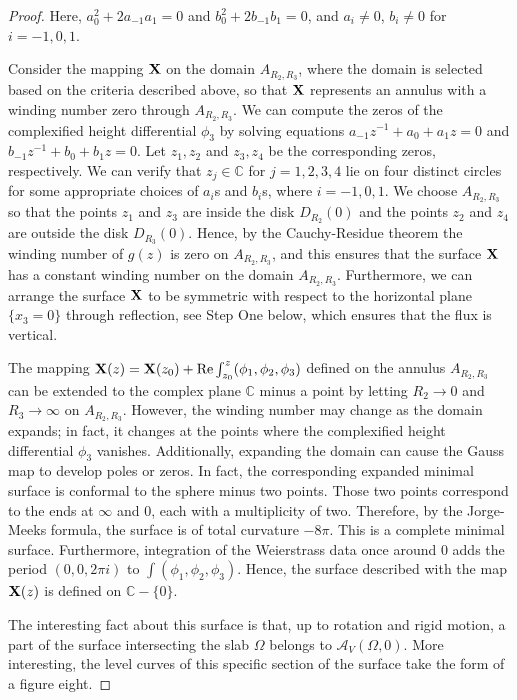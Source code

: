 \documentclass[11pt]{amsart}
\numberwithin{equation}{section}
\theoremstyle{theorem}
\theoremstyle{definition}
\numberwithin{equation}{section}
\begin{document}
\begin{proof}
Here, $a_0^2 + 2a_{-1}a_1 =0$ and $b_0^2 + 2b_{-1}b_1 =0$, and $a_i\neq 0$,  $b_i\neq 0$ for $i=-1,0,1$.
\medskip

Consider the mapping $\bold{X}$ on the domain $A_{R_2,R_3}$, where the domain is selected based on the criteria described above, so that $\bold{X}$ represents an annulus with a winding number zero through $A_{R_2,R_3}$. We can compute the zeros of the complexified height differential $\phi_3$ by solving equations  $a_{-1}z^{-1}+a_0+a_1z=0$ and $b_{-1}z^{-1}+b_0+b_1z=0$. Let $z_1,z_2$ and $z_3,z_4$ be the corresponding zeros, respectively. We can verify that $z_j \in \mathbb{C}$ for $j=1,2,3,4$ lie on four distinct circles for some appropriate choices of $a_i$s and $b_i$s, where $i=-1,0,1$. We choose $A_{R_2,R_3}$ so that the points $z_1$ and $z_3$ are inside the disk $D_{R_2}(0)$ and the points $z_2$ and $z_4$ are outside the disk $D_{R_3}(0)$. Hence, by the Cauchy-Residue theorem the winding number of $g(z)$ is zero on $A_{R_2,R_3}$, and this ensures that the surface $\bold{X}$ has a constant winding number on the domain $A_{R_2,R_3}$. Furthermore, we can arrange the surface $\bold{X}$ to be symmetric with respect to the horizontal plane $\{ x_3=0\}$ through reflection, see Step One below, which ensures that the flux is vertical.
\medskip

The mapping $\bold{X}(z)=\bold{X}(z_0)+\text{Re} \int_{z_0}^z(\phi_1,\phi_2,\phi_3)$ defined on the annulus $A_{R_2,R_3}$ can be extended to the complex plane $\mathbb{C}$ minus a point by letting $R_2 \rightarrow 0$ and $R_3 \rightarrow \infty$ on $A_{R_2,R_3}$. However, the winding number may change as the domain expands; in fact, it changes at the points where the complexified height differential $\phi_3$ vanishes. Additionally, expanding the domain can cause the Gauss map to develop poles or zeros. In fact, the corresponding expanded minimal surface is conformal to the sphere minus two points. Those two points correspond to the ends at $\infty$ and $0$, each with a multiplicity of two. Therefore, by the Jorge-Meeks formula, the surface is of total curvature $-8\pi$. This is a complete minimal surface. Furthermore, integration of the Weierstrass data once around $0$ adds the period $(0,0,2\pi i)$ to $\int (\phi_1,\phi_2,\phi_3)$. Hence, the surface described with the map $\bold{X}(z)$ is defined on $\mathbb{C}- \{0 \}$.

The interesting fact about this surface is that, up to rotation and rigid motion, a part of the surface intersecting the slab $\Omega$ belongs to $\mathcal{A}_V(\Omega ,0)$. More interesting, the level curves of this specific section of the surface take the form of a figure eight. 
\end{proof}
\end{document}
